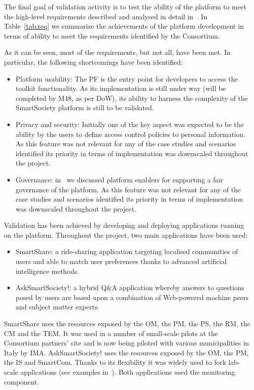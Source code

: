 

The final goal of validation activity is to test the ability of the platform to meet the high-level requirements %
described and analysed in detail in~\cite{D8.1}. In Table~\ref{tab:req} we summarize the achievements of the platform development in terms of ability to meet the requirements identified by the Consortium.

As it can be seen, most of the requirements, but not all, have been met. In particular, the following shortcomings have been identified:
\begin{itemize}
\item Platform usability: The PF is the entry point for developers to access the toolkit functionality. As its implementation is still under way (will be completed by M48, as per DoW), its ability to harness the complexity of the SmartSociety platform is still to be validated.
\item Privacy and security: Initially one of the key aspect was expected to be the ability by the users to define access control policies to personal information. As this feature was not relevant for any of the case studies and scenarios identified its priority in terms of implementation was downscaled throughout the project. 
\item Governance: in~\cite{D1.2} we discussed platform enablers for supporting a fair governance of the platform. As this feature was not relevant for any of the case studies and scenarios identified its priority in terms of implementation was downscaled throughout the project. 
\end{itemize}

Validation has been achieved by developing and deploying applications running on the platform. Throughout the project, two main applications have been used:
\begin{itemize}
\item SmartShare: a ride-sharing application targeting localised communities of users and able to match user preferences thanks to advanced artificial intelligence methods. 
\item AskSmartSociety!: a hybrid Q\&A application whereby answers to questions posed by users are based upon a combination of Web-powered machine peers and subject matter experts.
\end{itemize}
SmartShare uses the resources exposed by the OM, the PM, the PS, the RM, the CM and the TEM. It was used in a number of small-scale pilots at the Consortium partners' site and is now being piloted with various municipalities in Italy by IMA.
AskSmartSociety! uses the resources exposed by the OM, the PM, the IS and SmartCom. Thanks to its flexibility it was widely used to fork lab-scale applications (see examples in~\cite{D8.3}).
Both applications used the monitoring component.

